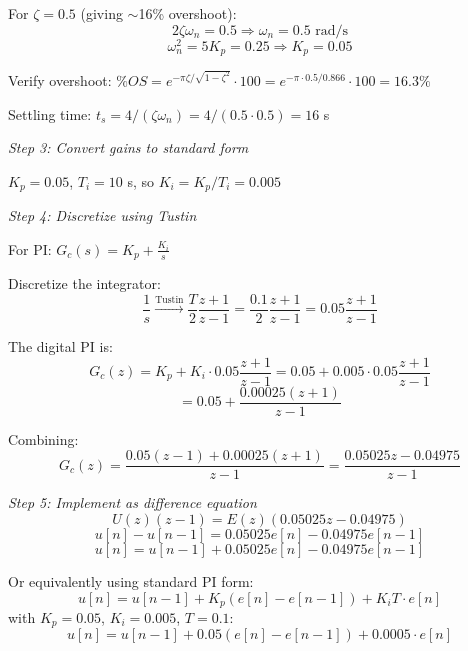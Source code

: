 \begin{example}
For $\zeta = 0.5$ (giving $\sim$16\% overshoot):
\begin{equation}
2\zeta\omega_n = 0.5 \Rightarrow \omega_n = 0.5 \text{ rad/s}
\end{equation}
\begin{equation}
\omega_n^2 = 5K_p = 0.25 \Rightarrow K_p = 0.05
\end{equation}

Verify overshoot: $\%OS = e^{-\pi\zeta/\sqrt{1-\zeta^2}} \cdot 100 = e^{-\pi \cdot 0.5/0.866} \cdot 100 = 16.3\%$ \checkmark

Settling time: $t_s = 4/(\zeta\omega_n) = 4/(0.5 \cdot 0.5) = 16$ s \checkmark

\textit{Step 3: Convert gains to standard form}

$K_p = 0.05$, $T_i = 10$ s, so $K_i = K_p/T_i = 0.005$

\textit{Step 4: Discretize using Tustin}

For PI: $G_c(s) = K_p + \frac{K_i}{s}$

Discretize the integrator:
\begin{equation}
\frac{1}{s} \xrightarrow{\text{Tustin}} \frac{T}{2}\frac{z+1}{z-1} = \frac{0.1}{2}\frac{z+1}{z-1} = 0.05\frac{z+1}{z-1}
\end{equation}

The digital PI is:
\begin{equation}
G_c(z) = K_p + K_i \cdot 0.05\frac{z+1}{z-1} = 0.05 + 0.005 \cdot 0.05\frac{z+1}{z-1}
\end{equation}
\begin{equation}
= 0.05 + \frac{0.00025(z+1)}{z-1}
\end{equation}

Combining:
\begin{equation}
G_c(z) = \frac{0.05(z-1) + 0.00025(z+1)}{z-1} = \frac{0.05025z - 0.04975}{z-1}
\end{equation}

\textit{Step 5: Implement as difference equation}
\begin{equation}
U(z)(z-1) = E(z)(0.05025z - 0.04975)
\end{equation}
\begin{equation}
u[n] - u[n-1] = 0.05025 e[n] - 0.04975 e[n-1]
\end{equation}
\begin{equation}
\boxed{u[n] = u[n-1] + 0.05025 e[n] - 0.04975 e[n-1]}
\end{equation}

Or equivalently using standard PI form:
\begin{equation}
u[n] = u[n-1] + K_p(e[n] - e[n-1]) + K_i T \cdot e[n]
\end{equation}
with $K_p = 0.05$, $K_i = 0.005$, $T = 0.1$:
\begin{equation}
u[n] = u[n-1] + 0.05(e[n] - e[n-1]) + 0.0005 \cdot e[n]
\end{equation}
\end{example}


